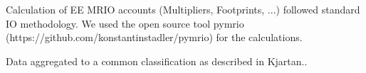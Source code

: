 Calculation of EE MRIO accounts (Multipliers, Footprints, ...) followed
standard IO methodology. We used the open source tool pymrio (https://github.com/konstantinstadler/pymrio) for the calculations.

Data aggregated to a common classification as described in Kjartan..